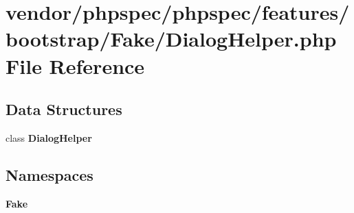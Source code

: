 \section{vendor/phpspec/phpspec/features/bootstrap/\+Fake/\+Dialog\+Helper.php File Reference}
\label{phpspec_2phpspec_2features_2bootstrap_2_fake_2_dialog_helper_8php}
\subsection*{Data Structures}
\begin{DoxyCompactItemize}
\item 
class {\bf Dialog\+Helper}
\end{DoxyCompactItemize}
\subsection*{Namespaces}
\begin{DoxyCompactItemize}
\item 
 {\bf Fake}
\end{DoxyCompactItemize}
